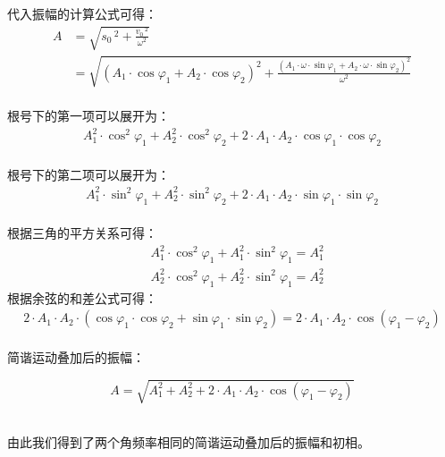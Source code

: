 \documentclass[UTF8]{ctexart}
\begin{document}
\newpage

    代入振幅的计算公式可得：\vspace{3pt}
    \begin{align}
        A
        &=\sqrt{s_0\,^2+\frac{v_0\,^2}{\omega^2}}\\[3mm]
        &=\sqrt{\left(A_1\cdot\cos{\varphi_1}+A_2\cdot\cos{\varphi_2}\right)^2+\frac{\left(A_1\cdot\omega\cdot\sin{\varphi_1}+A_2\cdot\omega\cdot\sin{\varphi_2}\right)^2}{\omega^2}}
    \end{align}\\
    根号下的第一项可以展开为：
    \begin{align}
        A_1^2\cdot\cos^2{\varphi_1}+A_2^2\cdot\cos^2{\varphi_2}+2\cdot A_1\cdot A_2\cdot\cos{\varphi_1}\cdot\cos{\varphi_2}
    \end{align}\\
    根号下的第二项可以展开为：
    \begin{align}
        A_1^2\cdot\sin^2{\varphi_1}+A_2^2\cdot\sin^2{\varphi_2}+2\cdot A_1\cdot A_2\cdot\sin{\varphi_1}\cdot\sin{\varphi_2}
    \end{align}\\
    根据三角的平方关系可得：
    \begin{align}
        &A_1^2\cdot\cos^2{\varphi_1}+A_1^2\cdot\sin^2{\varphi_1}=A_1^2\\[3mm]
        &A_2^2\cdot\cos^2{\varphi_1}+A_2^2\cdot\sin^2{\varphi_1}=A_2^2
    \end{align}
    根据余弦的和差公式可得：
    \begin{align}
        2\cdot A_1\cdot A_2\cdot(\cos{\varphi_1}\cdot\cos{\varphi_2}+\sin{\varphi_1}\cdot\sin{\varphi_2})=2\cdot A_1\cdot A_2\cdot\cos{(\varphi_1-\varphi_2)}
    \end{align}\\
    简谐运动叠加后的振幅：
    \begin{large}
        \begin{equation*}
            A=\sqrt{A_1^2+A_2^2+2\cdot A_1\cdot A_2\cdot\cos{(\varphi_1-\varphi_2)}}
        \end{equation*}
    \end{large}\\
    由此我们得到了两个角频率相同的简谐运动叠加后的振幅和初相。

\newpage
\end{document}
